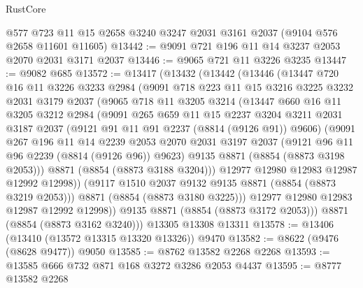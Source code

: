 \begin{lexlean}{RustCore}
\begin{coremodule}
    @577
    @723
    @11
    @15
    @2658
    @3240
    @3247
    @2031
    @3161
    @2037
    (@9104 @576 @2658 @11601 @11605)
@13442 := @9091 @721 @196 @11 @14 @3237 @2053 @2070 @2031 @3171 @2037
@13446 := @9065 @721 @11 @3226 @3235
@13447 := @9082 @685
@13572 := @13417
    (@13432
      (@13442
        (@13446
          (@13447
            @720
            @16
            @11
            @3226
            @3233
            @2984
            (@9091
              @718
              @223
              @11
              @15
              @3216
              @3225
              @3232
              @2031
              @3179
              @2037
              (@9065
                @718
                @11
                @3205
                @3214
                (@13447
                  @660
                  @16
                  @11
                  @3205
                  @3212
                  @2984
                  (@9091
                    @265
                    @659
                    @11
                    @15
                    @2237
                    @3204
                    @3211
                    @2031
                    @3187
                    @2037
                    (@9121 @91 @11 @91 @2237 (@8814 (@9126 @91)) @9606)
                    (@9091
                      @267
                      @196
                      @11
                      @14
                      @2239
                      @2053
                      @2070
                      @2031
                      @3197
                      @2037
                      (@9121 @96 @11 @96 @2239 (@8814 (@9126 @96)) @9623)
                      @9135
                      @8871
                      (@8854 (@8873 @3198 @2053)))
                    @8871
                    (@8854 (@8873 @3188 @3204)))
                  @12977
                  @12980
                  @12983
                  @12987
                  @12992
                  @12998))
              (@9117 @1510 @2037 @9132 @9135 @8871 (@8854 (@8873 @3219 @2053)))
              @8871
              (@8854 (@8873 @3180 @3225)))
            @12977
            @12980
            @12983
            @12987
            @12992
            @12998))
        @9135
        @8871
        (@8854 (@8873 @3172 @2053)))
      @8871
      (@8854 (@8873 @3162 @3240)))
    @13305
    @13308
    @13311
@13578 := @13406 (@13410 (@13572 @13315 @13320 @13326)) @9470
@13582 := @8622 (@9476 (@8628 @9477)) @9050
@13585 := @8762 @13582 @2268 @2268
@13593 := @13585 @666 @732 @871 @168 @3272 @3286 @2053 @4437
@13595 := @8777 @13582 @2268

\end{coremodule}
\end{lexlean}
